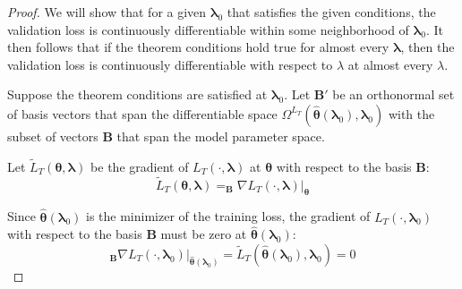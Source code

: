 \documentclass[10pt,letterpaper]{article}
\begin{document}
\begin{proof}
We will show that for a given $\boldsymbol \lambda_0$ that satisfies the given conditions, the validation loss is continuously differentiable within some neighborhood of $\boldsymbol \lambda_0$.  It then follows that if the theorem conditions hold true for almost every $\boldsymbol \lambda$, then the validation loss is continuously differentiable with respect to $\lambda$ at almost every $\lambda$.

Suppose the theorem conditions are satisfied at $\boldsymbol \lambda_0$. Let $\boldsymbol B'$ be an orthonormal set of basis vectors that span the differentiable space $\Omega^{L_T}(\hat {\boldsymbol \theta}(\boldsymbol \lambda_0), \boldsymbol \lambda_0)$ with the subset of vectors $\boldsymbol B$ that span the model parameter space.

Let $\tilde L_T(\boldsymbol \theta,\boldsymbol \lambda)$ be the gradient of $L_T(\cdot, \boldsymbol \lambda)$ at $\boldsymbol \theta$ with respect to the basis $\boldsymbol B$:
\begin{equation}
\tilde L_T(\boldsymbol \theta,\boldsymbol \lambda) = _{\boldsymbol B}\nabla L_T(\cdot, \boldsymbol \lambda) |_{\boldsymbol \theta}
\end{equation}

Since $\hat {\boldsymbol \theta}(\boldsymbol \lambda_0)$ is the minimizer of the training loss, the gradient of $L_T(\cdot, \boldsymbol \lambda_0)$ with respect to the basis $\boldsymbol B$ must be zero at $\hat {\boldsymbol \theta}(\boldsymbol \lambda_0)$:
\begin{equation}
_{\boldsymbol B}\nabla L_T(\cdot, \boldsymbol \lambda_0)|_{\hat {\boldsymbol \theta}(\boldsymbol \lambda_0)} = \tilde L_T(\hat {\boldsymbol \theta}(\boldsymbol \lambda_0), \boldsymbol \lambda_0) = 0
\end{equation}


\end{proof}
\end{document}
